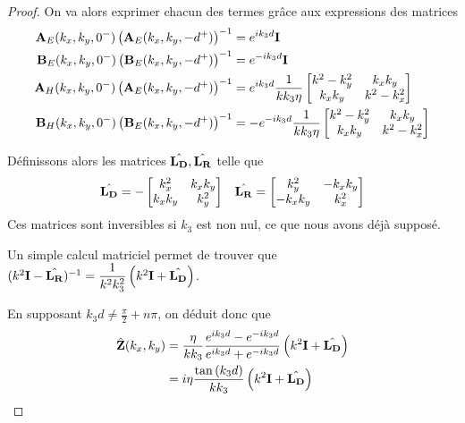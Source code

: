 \begin{proof}
            On va alors exprimer chacun des termes grâce aux expressions des matrices
            \begin{align}
                \mathbf{A}_E(k_x,k_y,0^-)\left(\mathbf{A}_E(k_x,k_y,-d^+)\right)^{-1} &= e^{ik_3d}\mathbf{I}
                \\
                \mathbf{B}_E(k_x,k_y,0^-)\left(\mathbf{B}_E(k_x,k_y,-d^+)\right)^{-1} &= e^{-ik_3d}\mathbf{I}
                \\
                \mathbf{A}_H(k_x,k_y,0^-)\left(\mathbf{A}_E(k_x,k_y,-d^+)\right)^{-1} &= e^{ik_3d}\dfrac{1}{kk_3\eta}
                \begin{bmatrix}
                    k^2 - k_y^2 & k_x k_y
                    \\
                    k_x k _y & k^2 - k_x^2
                \end{bmatrix}
                \\
                \mathbf{B}_H(k_x,k_y,0^-)\left(\mathbf{B}_E(k_x,k_y,-d^+)\right)^{-1} &= -e^{-ik_3d}\dfrac{1}{kk_3\eta}
                    \begin{bmatrix}
                    k^2 - k_y^2 & k_x k_y
                    \\
                    k_x k _y & k^2 - k_x^2
                \end{bmatrix} 
            \end{align}

            Définissons alors les matrices \(\hat{\mathbf{L_D}},\hat{\mathbf{L_R}}\) telle que
            \begin{align}
                \hat{\mathbf{L_D}} = -\begin{bmatrix}
                k_x^2 & k_x k_y
                \\
                k_x k _y & k_y^2
                \end{bmatrix}
                & & 
                \hat{\mathbf{L_R}} = \begin{bmatrix}
                k_y^2 & -k_x k_y
                \\
                -k_x k _y &  k_x^2
                \end{bmatrix}
            \end{align}
            Ces matrices sont inversibles si \(k_3\) est non nul, ce que nous avons déjà supposé.

            Un simple calcul matriciel permet de trouver que \( (k^2\mathbf{I} - \hat{\mathbf{L_R}})^{-1} = \dfrac{1}{k^2k_3^2}\left(k^2 \mathbf{I} + \hat{\mathbf{L_D}}\right) \).

            En supposant \(k_3d \not = \frac{\pi}{2} + n\pi\), on déduit donc que
            \begin{align}
                \hat {\mathbf{Z}}(k_x,k_y) &= \dfrac{\eta}{kk_3} \dfrac{e^{ik_3d} - e^{-ik_3d}}{e^{ik_3d} + e^{-ik_3d}}\left(k^2\mathbf{I} + \hat{\mathbf{L_D}}\right)
                \\
                &= i\eta\dfrac{\tan\left(k_3d\right)}{kk_3}\left(k^2\mathbf{I} + \hat{\mathbf{L_D}}\right)
            \end{align}

        \end{proof}
